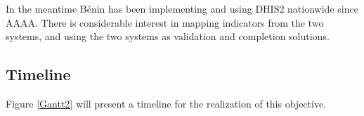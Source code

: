 In the meantime Bénin has been implementing and using DHIS2 nationwide since AAAA. There is considerable interest in mapping indicators from the two systems, and using the two systems as validation and completion solutions.






\subsection{Timeline}

Figure \ref{Gantt2} will present a timeline for the realization of this objective.

